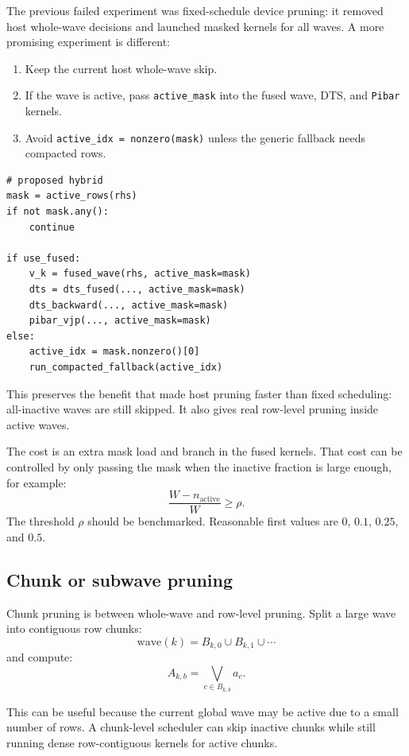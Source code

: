 \documentclass[11pt]{article}
\newcommand{\code}[1]{\texttt{#1}}
\begin{document}
The previous failed experiment was fixed-schedule device pruning: it removed
host whole-wave decisions and launched masked kernels for all waves.  A more
promising experiment is different:

\begin{enumerate}[leftmargin=*]
\item Keep the current host whole-wave skip.
\item If the wave is active, pass \code{active\_mask} into the fused wave, DTS,
      and \code{Pibar} kernels.
\item Avoid \code{active\_idx = nonzero(mask)} unless the generic fallback needs
      compacted rows.
\end{enumerate}

\begin{lstlisting}
# proposed hybrid
mask = active_rows(rhs)
if not mask.any():
    continue

if use_fused:
    v_k = fused_wave(rhs, active_mask=mask)
    dts = dts_fused(..., active_mask=mask)
    dts_backward(..., active_mask=mask)
    pibar_vjp(..., active_mask=mask)
else:
    active_idx = mask.nonzero()[0]
    run_compacted_fallback(active_idx)
\end{lstlisting}

This preserves the benefit that made host pruning faster than fixed scheduling:
all-inactive waves are still skipped.  It also gives real row-level pruning
inside active waves.

The cost is an extra mask load and branch in the fused kernels.  That cost can
be controlled by only passing the mask when the inactive fraction is large
enough, for example:
\[
  \frac{W - n_{\mathrm{active}}}{W} \ge \rho.
\]
The threshold \(\rho\) should be benchmarked.  Reasonable first values are
\(0\), \(0.1\), \(0.25\), and \(0.5\).

\subsection{Chunk or subwave pruning}

Chunk pruning is between whole-wave and row-level pruning.  Split a large wave
into contiguous row chunks:
\[
  \mathrm{wave}(k) = B_{k,0} \cup B_{k,1} \cup \cdots
\]
and compute:
\[
  A_{k,b} = \bigvee_{c \in B_{k,b}} a_c.
\]

This can be useful because the current global wave may be active due to a
small number of rows.  A chunk-level scheduler can skip inactive chunks while
still running dense row-contiguous kernels for active chunks.
\end{document}
